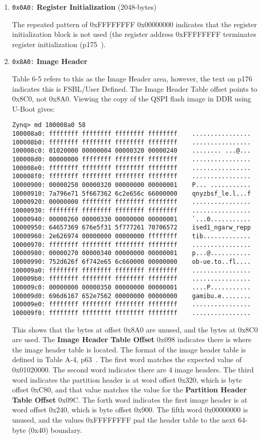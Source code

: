 \begin{enumerate}
\item \texttt{0x0A0:} \textbf{Register Initialization} (2048-bytes)

The repeated pattern of 0xFFFFFFFF 0x00000000 indicates that
the register initialization block is not used (the register
address 0xFFFFFFFF terminates register initialization
(p175~\cite{Xilinx_UG585_2018}).

\item \texttt{0x8A0:} \textbf{Image Header}

Table 6-5 refers to this as the Image Header area, however, the text on
p176 indicates this is FSBL/User Defined. The Image Header Table offset
points to 0x8C0, not 0x8A0. Viewing the copy of the QSPI flash image in
DDR using U-Boot gives:
%
\begin{verbatim}
Zynq> md 100008a0 58
100008a0: ffffffff ffffffff ffffffff ffffffff    ................
100008b0: ffffffff ffffffff ffffffff ffffffff    ................
100008c0: 01020000 00000004 00000320 00000240    ........ ...@...
100008d0: 00000000 ffffffff ffffffff ffffffff    ................
100008e0: ffffffff ffffffff ffffffff ffffffff    ................
100008f0: ffffffff ffffffff ffffffff ffffffff    ................
10000900: 00000250 00000320 00000000 00000001    P... ...........
10000910: 7a796e71 5f667362 6c2e656c 66000000    qnyzbsf_le.l...f
10000920: 00000000 ffffffff ffffffff ffffffff    ................
10000930: ffffffff ffffffff ffffffff ffffffff    ................
10000940: 00000260 00000330 00000000 00000001    `...0...........
10000950: 64657369 676e5f31 5f777261 70706572    ised1_ngarw_repp
10000960: 2e626974 00000000 00000000 ffffffff    tib.............
10000970: ffffffff ffffffff ffffffff ffffffff    ................
10000980: 00000270 00000340 00000000 00000001    p...@...........
10000990: 752d626f 6f742e65 6c660000 00000000    ob-ue.to..fl....
100009a0: ffffffff ffffffff ffffffff ffffffff    ................
100009b0: ffffffff ffffffff ffffffff ffffffff    ................
100009c0: 00000000 00000350 00000000 00000001    ....P...........
100009d0: 696d6167 652e7562 00000000 00000000    gamibu.e........
100009e0: ffffffff ffffffff ffffffff ffffffff    ................
100009f0: ffffffff ffffffff ffffffff ffffffff    ................
\end{verbatim}
%
This shows that the bytes at offset 0x8A0 are unused, and the bytes
at 0x8C0 are used.
The \textbf{Image Header Table Offset} 0x098 indicates there is where
the image header table is located. The format of the image
header table is defined in Table A-4, p63~\cite{Xilinx_UG821_2015}.
The first word matches the expected value of 0x01020000. The
second word indicates there are 4 image headers. The third word
indicates the partition header is at word offset 0x320, which is
byte offset 0xC80, and that value matches the value for the
\textbf{Partition Header Table Offset} 0x09C. The forth word
indicates the first image header is at word offset 0x240, which
is byte offset 0x900. The fifth word 0x00000000 is unused, and
the values 0xFFFFFFFF pad the header table to the next 64-byte
(0x40) boundary.


\end{enumerate}
